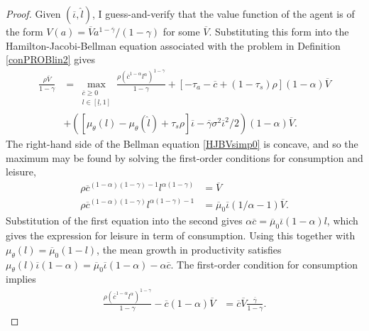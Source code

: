 \documentclass[11pt]{article}
\theoremstyle{plain}
\begin{document}
\begin{proof}
Given $(\overline{\iota}, \hat{l})$, I guess-and-verify that the value function of the agent is of the form $V(a) = \overline{V}a^{1-\overline{\gamma}}/(1-\gamma)$ for some $\overline{V}$. Substituting this form into the Hamilton-Jacobi-Bellman equation associated with the problem in Definition \ref{conPROBlin2} gives
\begin{equation}
\begin{aligned}
\frac{\rho \overline{V}}{1-\gamma} & = \max_{\substack{\overline{c} \geq 0 \\ l \in [\underline{l},1]}} \frac{\rho(\overline{c}^{1-\alpha}l^{\alpha})^{1-\gamma}}{1-\gamma} + [ - \tau_a - \overline{c} + (1-\tau_s)\rho](1-\alpha)\overline{V}
\\ & + {\left({\left[\mu_{\theta}(l) - \mu_{\theta}(\hat{l}) + \tau_s\rho\right]}\overline{\iota} - \overline{\gamma}\sigma^2\overline{\iota}^2/2\right)}(1-\alpha)\overline{V}.
\end{aligned}
\label{HJBVsimp0}
\end{equation}
The right-hand side of the Bellman equation \eqref{HJBVsimp0} is concave, and so the maximum may be found by solving the first-order conditions for consumption and leisure,
\begin{equation}
\begin{aligned}
\rho\overline{c}^{(1-\alpha)(1-\gamma)-1}l^{\alpha(1-\gamma)} & = \overline{V}
\\ \rho\overline{c}^{(1-\alpha)(1-\gamma)}l^{\alpha(1-\gamma)-1} & = \overline{\mu}_0\overline{\iota}(1/\alpha-1)\overline{V}.
\end{aligned} %
\label{FOC_ind}
\end{equation}
Substitution of the first equation into the second gives $\alpha \overline{c} = \overline{\mu}_0\overline{\iota}(1-\alpha)l$, which gives the expression for leisure in term of consumption. Using this together with $\mu_{\theta}(l) = \overline{\mu}_0(1-l)$, the mean growth in productivity satisfies $\mu_{\theta}(l)\overline{\iota}(1-\alpha) = \overline{\mu}_0\overline{\iota}(1-\alpha) - \alpha \overline{c}$. The first-order condition for consumption implies 
\begin{align*}
\frac{\rho(\overline{c}^{1-\alpha}l^{\alpha})^{1-\gamma}}{1-\gamma} - \overline{c}(1-\alpha)\overline{V} & %
= \overline{c}\overline{V}\frac{\overline{\gamma}}{1-\gamma}.

\end{align*}
\end{proof}
\end{document}
